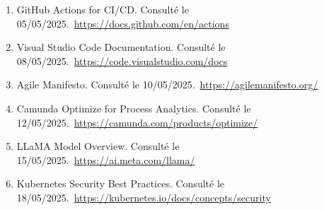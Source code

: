 \begin{enumerate}
\item[ref25] GitHub Actions for CI/CD. Consulté le 05/05/2025.\
\url{https://docs.github.com/en/actions}

\item[ref26] Visual Studio Code Documentation. Consulté le 08/05/2025.\
\url{https://code.visualstudio.com/docs}

\item[ref27] Agile Manifesto. Consulté le 10/05/2025.\
\url{https://agilemanifesto.org/}

\item[ref28] Camunda Optimize for Process Analytics. Consulté le 12/05/2025.\
\url{https://camunda.com/products/optimize/}

\item[ref29] LLaMA Model Overview. Consulté le 15/05/2025.\
\url{https://ai.meta.com/llama/}

\item[ref30] Kubernetes Security Best Practices. Consulté le 18/05/2025.\
\url{https://kubernetes.io/docs/concepts/security}
\end{enumerate}